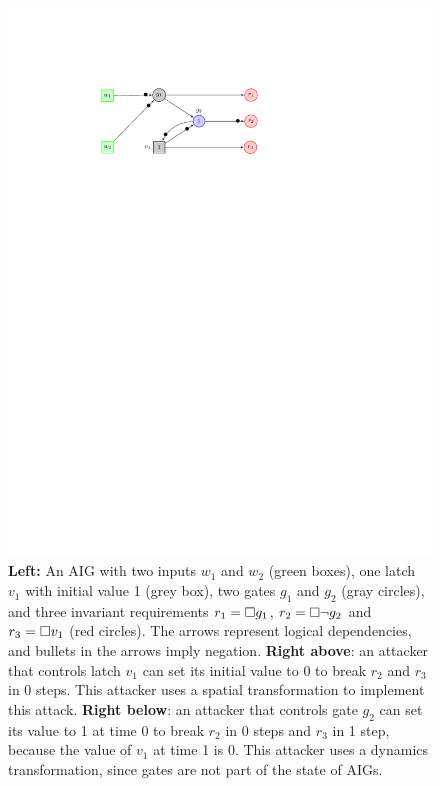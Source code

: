\begin{figure}[!t]
\begin{minipage}{0.35\textwidth}
\begin{framed}
	\includegraphics[width=\textwidth]{Attack1.pdf}
	\end{framed}
	\end{minipage}
	\caption{\textbf{Left:} An AIG with two
	inputs $w_1$ and $w_2$ (green boxes), one latch $v_1$ with initial value 1 (grey box), two gates $g_1$ and $g_2$ (gray circles), and three invariant requirements $r_1={{\square}} g_1$, $r_2={{\square}} \lnot g_2$ and $r_3={{\square}} v_1$ (red circles). 
	The arrows represent logical dependencies, and bullets in the arrows imply negation.
	\textbf{Right above}: an attacker that controls latch $v_1$ can set its initial value to 0 to break $r_2$ and $r_3$ in 0 steps. This attacker uses a spatial transformation to implement this attack.
	\textbf{Right below}: an attacker that controls gate $g_2$ can set its value to 1 at time 0 to break $r_2$ in 0 steps and $r_3$ in 1 step, because the value of $v_1$ at time 1 is 0. This attacker uses a dynamics transformation, since gates are not part of the state of AIGs.}%
	\label{fig:Classification:Example}
	\end{figure}

